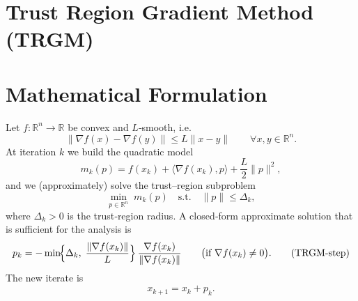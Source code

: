 \documentclass{article}
\begin{document}
\section*{Trust Region Gradient Method (TRGM)}

\section*{Mathematical Formulation}
Let $f:\mathbb{R}^n\rightarrow\mathbb{R}$ be convex and $L$‑smooth, i.e.
\[
\|\nabla f(x)-\nabla f(y)\|\le L\|x-y\|\qquad\forall x,y\in\mathbb{R}^n .
\]
At iteration $k$ we build the quadratic model
\[
m_k(p)=f(x_k)+\langle\nabla f(x_k),p\rangle+\frac{L}{2}\|p\|^2 ,
\]
and we (approximately) solve the trust–region subproblem
\begin{equation}
\label{eq:subprob}
\min_{p\in\mathbb{R}^n}\; m_k(p)\quad\text{s.t.}\quad \|p\|\le \Delta_k ,
\end{equation}
where $\Delta_k>0$ is the trust‑region radius.  
A closed‑form approximate solution that is sufficient for the analysis is
\[
p_k=
-\min\!\Bigl\{\Delta_k,\;\frac{\|\nabla f(x_k)\|}{L}\Bigr\}\,
\frac{\nabla f(x_k)}{\|\nabla f(x_k)\|}\qquad
\bigl(\text{if }\nabla f(x_k)\neq0\bigr) .
\tag{TRGM‑step}
\]
The new iterate is
\[
x_{k+1}=x_k+p_k .
\]
\end{document}
